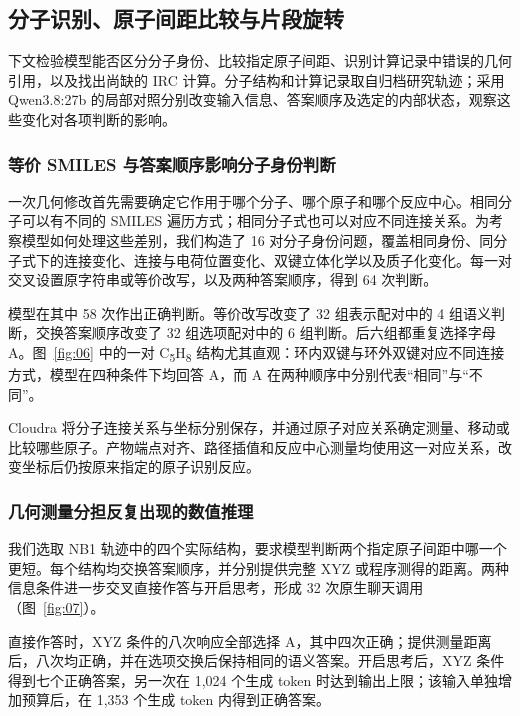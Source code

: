 

\subsection{分子识别、原子间距比较与片段旋转}

下文检验模型能否区分分子身份、比较指定原子间距、识别计算记录中错误的几何引用，以及找出尚缺的 IRC 计算。分子结构和计算记录取自归档研究轨迹；采用 Qwen3.8:27b 的局部对照分别改变输入信息、答案顺序及选定的内部状态，观察这些变化对各项判断的影响。

\subsubsection{等价 SMILES 与答案顺序影响分子身份判断}
\label{sec:identity-judgments}

一次几何修改首先需要确定它作用于哪个分子、哪个原子和哪个反应中心。相同分子可以有不同的 SMILES 遍历方式；相同分子式也可以对应不同连接关系。为考察模型如何处理这些差别，我们构造了 16 对分子身份问题，覆盖相同身份、同分子式下的连接变化、连接与电荷位置变化、双键立体化学以及质子化变化。每一对交叉设置原字符串或等价改写，以及两种答案顺序，得到 64 次判断。

模型在其中 58 次作出正确判断。等价改写改变了 32 组表示配对中的 4 组语义判断，交换答案顺序改变了 32 组选项配对中的 6 组判断。后六组都重复选择字母 A。图~\ref{fig:06} 中的一对 C\textsubscript{5}H\textsubscript{8} 结构尤其直观：环内双键与环外双键对应不同连接方式，模型在四种条件下均回答 A，而 A 在两种顺序中分别代表“相同”与“不同”。

Cloudra 将分子连接关系与坐标分别保存，并通过原子对应关系确定测量、移动或比较哪些原子。产物端点对齐、路径插值和反应中心测量均使用这一对应关系，改变坐标后仍按原来指定的原子识别反应。

\subsubsection{几何测量分担反复出现的数值推理}

我们选取 NB1 轨迹中的四个实际结构，要求模型判断两个指定原子间距中哪一个更短。每个结构均交换答案顺序，并分别提供完整 XYZ 或程序测得的距离。两种信息条件进一步交叉直接作答与开启思考，形成 32 次原生聊天调用（图~\ref{fig:07}）。

直接作答时，XYZ 条件的八次响应全部选择 A，其中四次正确；提供测量距离后，八次均正确，并在选项交换后保持相同的语义答案。开启思考后，XYZ 条件得到七个正确答案，另一次在 1,024 个生成 token 时达到输出上限；该输入单独增加预算后，在 1,353 个生成 token 内得到正确答案。

